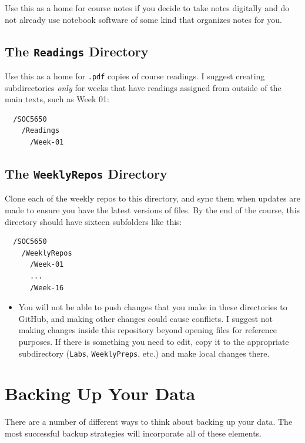 \documentclass[]{book}
\newenvironment{rmdblock}[1]
  {\begin{shaded*}
  \begin{itemize}
  \renewcommand{\labelitemi}{
    \raisebox{-.7\height}[0pt][0pt]{
      {\setkeys{Gin}{width=3em,keepaspectratio}\texttt{[image: images/\#1]}}
    }
  }
  \item
  }
  {
  \end{itemize}
  \end{shaded*}
  }
\newenvironment{rmdwarning}
  {\begin{rmdblock}{warning}}
  {\end{rmdblock}}
\theoremstyle{definition}
\theoremstyle{definition}
\theoremstyle{definition}
\theoremstyle{remark}
\begin{document}
Use this as a home for course notes if you decide to take notes
digitally and do not already use notebook software of some kind that
organizes notes for you.

\subsection{\texorpdfstring{The \texttt{Readings}
Directory}{The Readings Directory}}\label{the-readings-directory}

Use this as a home for \texttt{.pdf} copies of course readings. I
suggest creating subdirectories \emph{only} for weeks that have readings
assigned from outside of the main texts, such as Week 01:

\begin{verbatim}
  /SOC5650
    /Readings
      /Week-01
\end{verbatim}

\subsection{\texorpdfstring{The \texttt{WeeklyRepos}
Directory}{The WeeklyRepos Directory}}\label{the-weeklyrepos-directory}

Clone each of the weekly repos to this directory, and sync them when
updates are made to ensure you have the latest versions of files. By the
end of the course, this directory should have sixteen subfolders like
this:

\begin{verbatim}
  /SOC5650
    /WeeklyRepos
      /Week-01
      ...
      /Week-16
\end{verbatim}

\begin{rmdwarning}
You will not be able to push changes that you make in these directories
to GitHub, and making other changes could cause conflicts. I suggest not
making changes inside this repository beyond opening files for reference
purposes. If there is something you need to edit, copy it to the
appropriate subdirectory (\texttt{Labs}, \texttt{WeeklyPreps}, etc.) and
make local changes there.
\end{rmdwarning}

\section{Backing Up Your Data}\label{backing-up-your-data}

There are a number of different ways to think about backing up your
data. The most successful backup strategies will incorporate all of
these elements.
\end{document}
